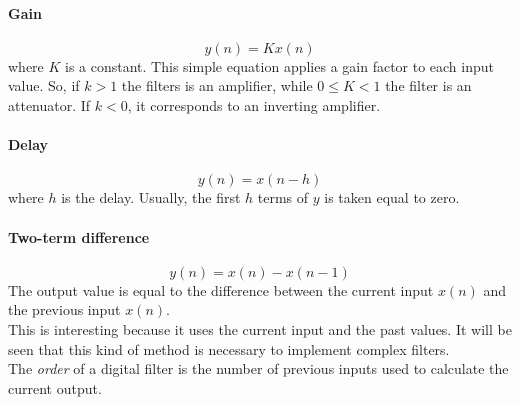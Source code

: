 \paragraph{Gain}
\[ y(n) = Kx(n) \]
where $K$ is a constant. This simple equation applies a gain factor to each input value. So, if $k>1$ the filters is an amplifier, while $0 \leq K < 1$ the filter is an attenuator. If $k<0$, it corresponds to an inverting amplifier.\\
\paragraph{Delay}
\[ y(n) = x(n-h) \]
where $h$ is the delay. Usually, the first $h$ terms of $y$ is taken equal to zero. 
\paragraph{Two-term difference}
\[ y(n) = x(n) -x(n-1) \]
The output value is equal to the difference between the current input $x(n)$ and the previous input $x(n)$.\\ 
This is interesting because it uses the current input and the past values. It will be seen that this kind of method is necessary to implement complex filters.\cite{introdigital}\\
The \textit{order} of a digital filter is the number of previous inputs used to calculate the current output.
